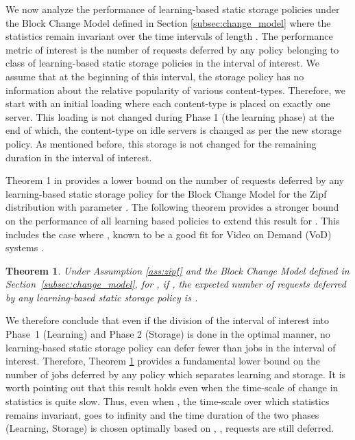 \documentclass[10pt, conference, letterpaper]{IEEEtran}
\newtheorem{theorem}{Theorem}
\begin{document}
We now analyze the performance of learning-based static storage
policies under the Block Change Model defined in Section
\ref{subsec:change_model} where the statistics remain invariant over
the time intervals of length . The performance metric of
interest is the number of requests deferred by any policy belonging to
class of learning-based static storage policies in the interval of
interest. We assume that at the beginning of this interval, the
storage policy has no information about the relative popularity of
various content-types. Therefore, we start with an initial loading
where each content-type is placed on exactly one server. This loading is
not changed during Phase 1 (the learning phase) at the end of which,
the content-type on idle servers is changed as per the new storage
policy. As mentioned before, this storage is not changed for the
remaining duration in the interval of interest.




Theorem 1 in \cite{SGSS14} provides a lower bound on the number of requests
deferred by any learning-based static storage policy for the Block Change Model for the Zipf distribution with parameter . The following theorem provides a stronger bound on the performance of all learning based policies to extend this result for . This includes the case where , known to be a good fit for Video on Demand (VoD) systems \cite{fricker2012impact}.


\begin{theorem}
	\label{thm:converse}
	Under Assumption \ref{ass:zipf} and the Block Change Model defined in
	Section~\ref{subsec:change_model}, for , if , the expected number
	of requests deferred by any learning-based static storage policy is
	.
\end{theorem}

We therefore conclude that even if the division of the interval of
interest into Phase~1 (Learning) and Phase 2 (Storage) is done in the
optimal manner, no learning-based static storage policy can defer
fewer than  jobs in the interval of
interest. Therefore, Theorem \ref{thm:converse} provides a fundamental
lower bound on the number of jobs deferred by any policy which
separates learning and storage. It is worth pointing out that this
result holds even when the time-scale of change in statistics is quite
slow. Thus, even when , the time-scale over which statistics
remains invariant, goes to infinity and the time duration of the two phases
(Learning, Storage) is chosen optimally based on , ,  requests are still deferred.
\end{document}
